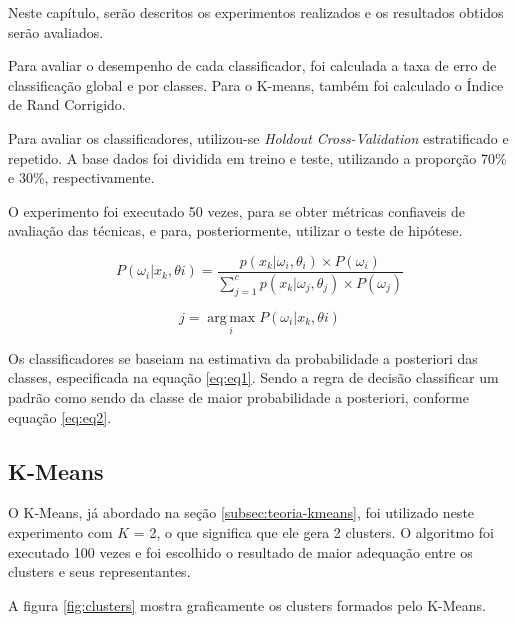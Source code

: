 
Neste capítulo, serão descritos os experimentos realizados e os resultados obtidos serão avaliados.

Para avaliar o desempenho de cada classificador, foi calculada a taxa de erro de classificação global e por classes. Para o K-means, também foi calculado o Índice de Rand Corrigido.

Para avaliar os classificadores, utilizou-se \textit{Holdout Cross-Validation} estratificado e repetido. A base dados foi dividida em treino e teste, utilizando a proporção 70\% e 30\%, respectivamente.

O experimento foi executado 50 vezes, para se obter métricas confiaveis de avaliação das técnicas, e para, posteriormente, utilizar o teste de hipótese.

\begin{equation}
\label{eq:eq1}
P(\omega_{i} | x_{k},\theta{i}) = \dfrac{p(x_k| \omega_i, \theta_i) \times P(\omega_i)}{\sum_{j=1}^c p(x_k | \omega_j, \theta_j) \times P(\omega_j)}
\end{equation}

\begin{equation}
\label{eq:eq2}
j = \operatorname*{arg\,max}_i P(\omega_{i} | x_{k},\theta{i})
\end{equation}

Os classificadores se baseiam na estimativa da probabilidade a posteriori das classes, especificada na equação \ref{eq:eq1}. Sendo a regra de decisão classificar um padrão como sendo da classe de maior probabilidade a posteriori, conforme equação \ref{eq:eq2}.




\subsection{K-Means}
\label{subsec:exp-kmeans}

O K-Means, já abordado na seção \ref{subsec:teoria-kmeans}, foi utilizado neste experimento com $K$ = 2, o que significa que ele gera 2 clusters. O algoritmo foi executado 100 vezes e foi escolhido o resultado de maior adequação entre os clusters e seus representantes.

A figura \ref{fig:clusters} mostra graficamente os clusters formados pelo K-Means.

